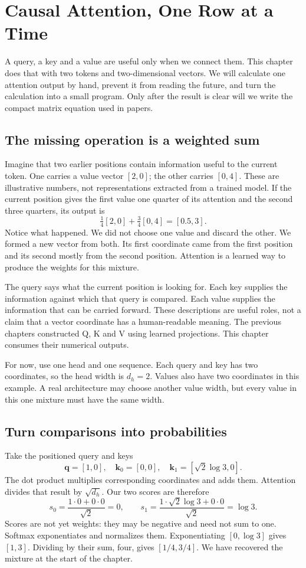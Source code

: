\chapter{Causal Attention, One Row at a Time}\label{ch:causal-attention}
\begin{ChapterIntent}
A query, a key and a value are useful only when we connect them. This chapter
does that with two tokens and two-dimensional vectors. We will calculate
one attention output by hand, prevent it from reading the future, and turn
the calculation into a small program. Only after the result is clear will
we write the compact matrix equation used in papers.
\end{ChapterIntent}

\section{The missing operation is a weighted sum}
Imagine that two earlier positions contain information useful to the current
token. One carries a value vector $[2,0]$; the other carries $[0,4]$. These
are illustrative numbers, not representations extracted from a trained
model. If the current position gives the first value one quarter of its
attention and the second three quarters, its output is
\[
 \tfrac14[2,0]+\tfrac34[0,4]=[0.5,3].
\]
Notice what happened. We did not choose one value and discard the other.
We formed a new vector from both. Its first coordinate came from the first
position and its second mostly from the second position. Attention is a
learned way to produce the weights for this mixture.

The query says what the current position is looking for. Each key supplies
the information against which that query is compared. Each value supplies
the information that can be carried forward. These descriptions are useful
roles, not a claim that a vector coordinate has a human-readable meaning.
The previous chapters constructed Q, K and V using learned projections.
This chapter consumes their numerical outputs.

For now, use one head and one sequence. Each query and key has two
coordinates, so the head width is $d_h=2$. Values also have two coordinates
in this example. A real architecture may choose another value width, but
every value in this one mixture must have the same width.

\section{Turn comparisons into probabilities}
Take the positioned query and keys
\[
 \mathbf q=[1,0],\quad
 \mathbf k_0=[0,0],\quad
 \mathbf k_1=[\sqrt2\log3,0].
\]
The dot product multiplies corresponding coordinates and adds them.
Attention divides that result by $\sqrt{d_h}$. Our two scores are therefore
\[
 s_0=\frac{1\cdot0+0\cdot0}{\sqrt2}=0,\qquad
 s_1=\frac{1\cdot\sqrt2\log3+0\cdot0}{\sqrt2}=\log3.
\]
Scores are not yet weights: they may be negative and need not sum to one.
Softmax exponentiates and normalizes them. Exponentiating $[0,\log3]$
gives $[1,3]$. Dividing by their sum, four, gives $[1/4,3/4]$.
We have recovered the mixture at the start of the chapter.


